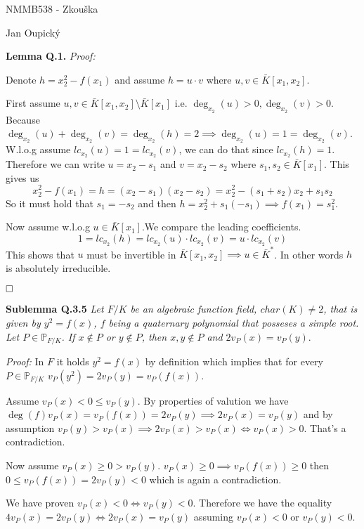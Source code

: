 \documentclass[12pt, a4paper]{article}
\newcommand{\qed}{\hfill\square}
\begin{document}
\begin{center}
\large NMMB538 - Zkouška

\normalsize Jan Oupický
\end{center}
\vspace{1\baselineskip}

\textbf{Lemma Q.1.} \textit{Proof:}

Denote $h = x_2^2 - f(x_1)$ and assume $h = u \cdot v$ where $u, v \in \bar{K}[x_1,x_2]$. 

First assume $u,v \in \bar{K}[x_1,x_2] \setminus \bar{K}[x_1]$ i.e. $\deg_{x_2}(u) > 0, \deg_{x_2}(v) > 0$. Because $\deg_{x_2}(u) + \deg_{x_2}(v) = \deg_{x_2}(h) = 2 \implies \deg_{x_2}(u) = 1 = \deg_{x_2}(v)$. W.l.o.g assume $lc_{x_2}(u)=1=lc_{x_2}(v)$, we can do that since $lc_{x_2}(h)=1$. Therefore we can write $u = x_2 - s_1$ and $v = x_2 - s_2$ where $s_1, s_2 \in \bar{K}[x_1]$. This gives us
\[
x_2^2 - f(x_1) =h = (x_2 - s_1)(x_2 - s_2) = x_2^2 - (s_1+s_2)x_2 + s_1 s_2
\]
So it must hold that $s_1 = -s_2$ and then $h = x_2^2 + s_1(-s_1) \implies f(x_1) = s_1^2$. 

Now assume w.l.o.g $u \in \bar{K}[x_1]$.We compare the leading coefficients.
\[
1 = lc_{x_2}(h) = lc_{x_2}(u) \cdot lc_{x_2}(v) = u \cdot lc_{x_2}(v)
\]
This shows that $u$ must be invertible in $\bar{K}[x_1,x_2] \implies u \in \bar{K}^*$. In other words $h$ is absolutely irreducible. 

$\qed$

\textbf{Sublemma Q.3.5} \textit{Let $F/K$ be an algebraic function field, $char(K) \neq 2$, that is given by $y^2 = f(x)$, $f$ being a quaternary polynomial that posseses a simple root. Let $P \in \mathbb{P}_{F/K}$. If $x \notin P$ or $y \notin P$, then $x,y \notin P$ and $2v_P(x)=v_P(y)$}.

\textit{Proof:}
In $F$ it holds $y^2 = f(x)$ by definition which implies that for every $P \in \mathbb{P}_{F/K}$ $v_P(y^2) = 2v_P(y)=v_P(f(x))$.

Assume $v_P(x) < 0 \leq v_P(y)$. By properties of valution we have $\deg(f)v_P(x) = v_P(f(x)) = 2v_P(y) \implies 2v_P(x)=v_P(y)$ and by assumption $v_P(y) > v_P(x) \implies 2v_P(x) > v_P(x) \iff v_P(x) > 0$. That's a contradiction.

Now assume $v_P(x) \geq 0 > v_P(y)$. $v_P(x) \geq 0 \implies v_P(f(x)) \geq 0$ then $0 \leq v_P(f(x)) = 2v_P(y) < 0$ which is again a contradiction.

We have proven $v_P(x) < 0 \iff v_P(y) < 0$. Therefore we have the equality $4v_P(x) = 2v_P(y) \iff 2v_P(x) = v_P(y)$ assuming $v_P(x) < 0$ or $v_P(y) < 0$. 
\end{document}
